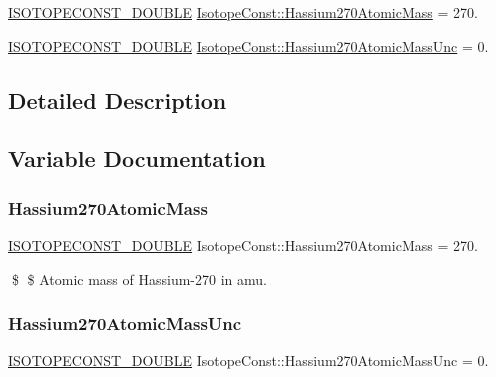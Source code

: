 \begin{DoxyCompactItemize}
\item 
\mbox{\hyperlink{group___isotope_const-_macros_ga8f45a7272ce02c0b4c65c44636ed719a}{I\+S\+O\+T\+O\+P\+E\+C\+O\+N\+S\+T\+\_\+\+D\+O\+U\+B\+LE}} \mbox{\hyperlink{group___isotope_const-_hassium-_hs270_ga5b34ed9400fd355fa044b9dbaebd6215}{Isotope\+Const\+::\+Hassium270\+Atomic\+Mass}} = 270.
\item 
\mbox{\hyperlink{group___isotope_const-_macros_ga8f45a7272ce02c0b4c65c44636ed719a}{I\+S\+O\+T\+O\+P\+E\+C\+O\+N\+S\+T\+\_\+\+D\+O\+U\+B\+LE}} \mbox{\hyperlink{group___isotope_const-_hassium-_hs270_ga361f207f143245297055440ccdbf0229}{Isotope\+Const\+::\+Hassium270\+Atomic\+Mass\+Unc}} = 0.
\end{DoxyCompactItemize}


\subsection{Detailed Description}


\subsection{Variable Documentation}
\mbox{\label{group___isotope_const-_hassium-_hs270_ga5b34ed9400fd355fa044b9dbaebd6215}} 
\subsubsection{\texorpdfstring{Hassium270\+Atomic\+Mass}{Hassium270AtomicMass}}
{\footnotesize\ttfamily \mbox{\hyperlink{group___isotope_const-_macros_ga8f45a7272ce02c0b4c65c44636ed719a}{I\+S\+O\+T\+O\+P\+E\+C\+O\+N\+S\+T\+\_\+\+D\+O\+U\+B\+LE}} Isotope\+Const\+::\+Hassium270\+Atomic\+Mass = 270.}

\$ \$ Atomic mass of Hassium-\/270 in amu. \mbox{\label{group___isotope_const-_hassium-_hs270_ga361f207f143245297055440ccdbf0229}} 
\subsubsection{\texorpdfstring{Hassium270\+Atomic\+Mass\+Unc}{Hassium270AtomicMassUnc}}
{\footnotesize\ttfamily \mbox{\hyperlink{group___isotope_const-_macros_ga8f45a7272ce02c0b4c65c44636ed719a}{I\+S\+O\+T\+O\+P\+E\+C\+O\+N\+S\+T\+\_\+\+D\+O\+U\+B\+LE}} Isotope\+Const\+::\+Hassium270\+Atomic\+Mass\+Unc = 0.}

